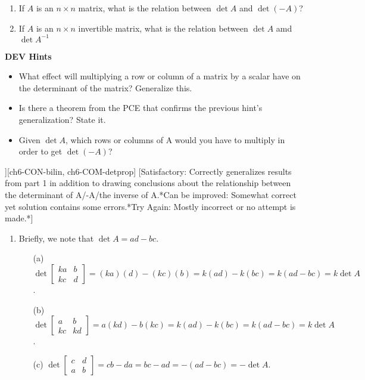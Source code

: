 \begin{SaveQuestion}
{\begin{enumerate}
        \item If $A$ is an $n\times n$ matrix, what is the relation between $\det A$ and $\det(-A)$?
        \item If $A$ is an $n \times n$ invertible matrix, what is the relation between $\det A$ amd $\det A^{-1}$
        \end{enumerate}
        \textbf{DEV Hints}
        \begin{itemize}
            \item What effect will multiplying a row or column of a matrix by a scalar have on the determinant of the matrix? Generalize this.
            \item Is there a theorem from the PCE that confirms the previous hint's generalization? State it.
            \item Given $\det A$, which rows or columns of A would you have to multiply in order to get $\det (-A)$?
        \end{itemize}}
][ch6-CON-bilin, ch6-COM-detprop] %
    [Satisfactory: Correctly generalizes results from part 1 in addition to drawing conclusions about the relationship between the determinant of A/-A/the inverse of A.*Can be improved: Somewhat correct yet solution contains some errors.*Try Again: Mostly incorrect or no attempt is made.*]    %
    \begin{enumerate}
        \item Briefly, we note that $\det A = ad - bc$. 
        \begin{enumerate}
            \item[(a)] $\det\begin{bmatrix} ka & b \\ kc & d \end{bmatrix} = (ka)(d) - (kc)(b) = k(ad) - k(bc) = k(ad - bc) = k\det A$. 

            \item[(b)] $\det\begin{bmatrix} a & b \\ kc & kd \end{bmatrix} = a(kd) - b(kc) = k(ad) - k(bc) = k(ad - bc) = k\det A$. 

            \item[(c)] $\det\begin{bmatrix} c & d \\ a & b \end{bmatrix} = cb - da = bc - ad = -(ad - bc) = -\det A$. 


\end{enumerate}
\end{enumerate}
\end{SaveQuestion}
